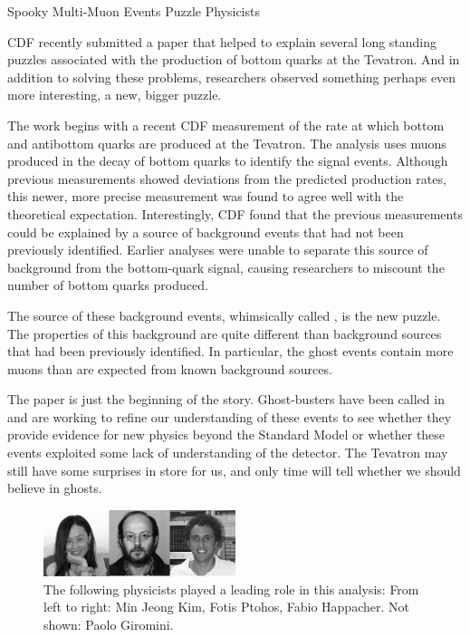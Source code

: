 \begin{SubArticle}[enhanced, tikz={rotate=0}]{Spooky Multi-Muon Events Puzzle Physicists}
  \begin{multicols}{2}

    CDF recently submitted a paper that helped to explain several long
    standing puzzles associated with the production of bottom quarks
    at the Tevatron. And in addition to solving these problems,
    researchers observed something perhaps even more interesting, a
    new, bigger puzzle. 
    
    The work begins with a recent CDF measurement of the rate at which
    bottom and antibottom quarks are produced at the Tevatron. The
    analysis uses muons produced in the decay of bottom quarks to identify
    the signal events. Although previous measurements showed deviations
    from the predicted production rates, this newer, more precise
    measurement was found to agree well with the theoretical
    expectation. Interestingly, CDF found that the previous measurements
    could be explained by a source of background events that had not been
    previously identified. Earlier analyses were unable to separate this
    source of background from the bottom-quark signal, causing researchers
    to miscount the number of bottom quarks produced. 
    
    The source of these background events, whimsically called , is the new puzzle. The properties of this background are
    quite different than background sources that had been previously
    identified. In particular, the ghost events contain more muons than
    are expected from known background sources. 
    
    The paper is just the beginning of the story. Ghost-busters have been
    called in and are working to refine our understanding of these events
    to see whether they provide evidence for new physics beyond the
    Standard Model or whether these events exploited some lack of
    understanding of the detector. The Tevatron may still have some
    surprises in store for us, and only time will tell whether we should
    believe in ghosts.
    
    \begin{figure}
      \begin{center}
        \vspace{-0.2in}
        \leavevmode
        \includegraphics[width=0.5\textwidth]{./figures/Fotios-MinJeongKimBW.jpg}
        \caption*{The following physicists played a leading role in this analysis: From
          left to right: Min Jeong Kim, Fotis Ptohos, Fabio Happacher. Not shown: Paolo Giromini.}
      \end{center}
    \end{figure}
  \end{multicols}
\end{SubArticle}
